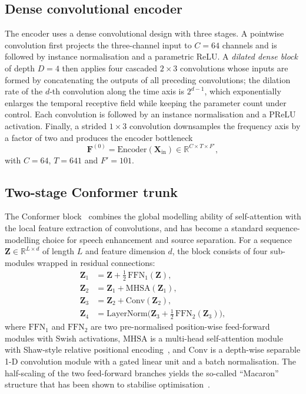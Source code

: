 \documentclass[a4paper,fleqn]{cas-sc}
\begin{document}
\subsection{Dense convolutional encoder}\label{sec:method:encoder}

The encoder uses a dense convolutional design with three stages. A pointwise convolution first projects the
three-channel input to $C=64$ channels and is followed by instance
normalisation and a parametric ReLU. A \emph{dilated dense block} of
depth $D=4$ then applies four cascaded $2\times 3$ convolutions whose
inputs are formed by concatenating the outputs of all preceding
convolutions; the dilation rate of the $d$-th convolution along the time
axis is $2^{d-1}$, which exponentially enlarges the temporal receptive
field while keeping the parameter count under control. Each
convolution is followed by an instance normalisation and a PReLU
activation. Finally, a strided $1\times 3$ convolution downsamples the
frequency axis by a factor of two and produces the encoder bottleneck
\begin{equation}\label{eq:encoder}
  \mathbf{F}^{(0)} = \mathrm{Encoder}(\mathbf{X}_{\mathrm{in}})
        \in \mathbb{R}^{C\times T\times F'},
\end{equation}
with $C=64$, $T=641$ and $F'=101$.

\subsection{Two-stage Conformer trunk}\label{sec:method:tscb}

The Conformer block~\citep{gulati2020conformer} combines the global
modelling ability of self-attention with the local feature extraction
of convolutions, and has become a standard sequence-modelling choice
for speech enhancement and source separation. For a sequence
$\mathbf{Z}\in\mathbb{R}^{L\times d}$ of length $L$ and feature
dimension $d$, the block consists of four sub-modules wrapped in
residual connections:
\begin{equation}\label{eq:conformer}
  \begin{aligned}
    \mathbf{Z}_1 &= \mathbf{Z} + \tfrac{1}{2}\,\mathrm{FFN}_1(\mathbf{Z}),\\
    \mathbf{Z}_2 &= \mathbf{Z}_1 + \mathrm{MHSA}(\mathbf{Z}_1),\\
    \mathbf{Z}_3 &= \mathbf{Z}_2 + \mathrm{Conv}(\mathbf{Z}_2),\\
    \mathbf{Z}_4 &= \mathrm{LayerNorm}\bigl(\mathbf{Z}_3 +
                    \tfrac{1}{2}\,\mathrm{FFN}_2(\mathbf{Z}_3)\bigr),
  \end{aligned}
\end{equation}
where $\mathrm{FFN}_1$ and $\mathrm{FFN}_2$ are two pre-normalised
position-wise feed-forward modules with Swish activations,
$\mathrm{MHSA}$ is a multi-head self-attention module with Shaw-style
relative positional encoding~\citep{shaw2018relativepos}, and
$\mathrm{Conv}$ is a depth-wise separable 1-D convolution module with a
gated linear unit and a batch normalisation. The half-scaling of the two
feed-forward branches yields the so-called ``Macaron'' structure that
has been shown to stabilise optimisation~\citep{gulati2020conformer}.
\end{document}
